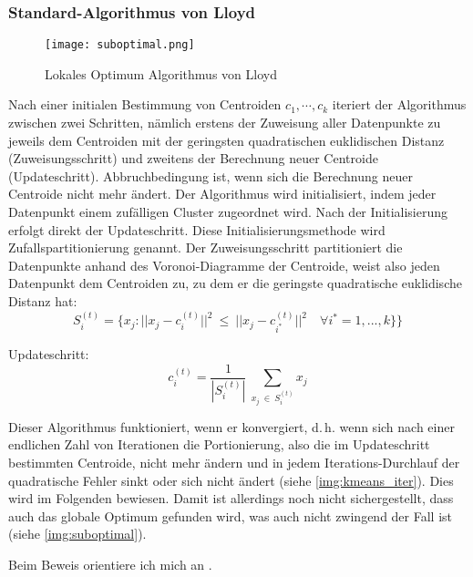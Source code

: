 \documentclass[a4paper,12pt,twoside]{article}
\begin{document}
\subsubsection{Standard-Algorithmus von Lloyd}

\begin{figure}
	\centering
	\texttt{[image: suboptimal.png]}
	\caption{Lokales Optimum Algorithmus von Lloyd}
	\label{img:suboptimal}
\end{figure}

Nach einer initialen Bestimmung von Centroiden $c_1,\cdots,c_k$ iteriert der Algorithmus zwischen zwei Schritten, nämlich erstens der Zuweisung aller Datenpunkte zu jeweils dem Centroiden mit der geringsten quadratischen euklidischen Distanz (Zuweisungsschritt) und zweitens der Berechnung neuer Centroide (Updateschritt). Abbruchbedingung ist, wenn sich die Berechnung neuer Centroide nicht mehr ändert.
Der Algorithmus wird initialisiert, indem jeder Datenpunkt einem zufälligen Cluster zugeordnet wird. Nach der Initialisierung erfolgt direkt der Updateschritt. Diese Initialisierungsmethode wird Zufallspartitionierung genannt.
Der Zuweisungsschritt partitioniert die Datenpunkte anhand des Voronoi-Diagramme der Centroide, weist also jeden Datenpunkt dem Centroiden zu, zu dem er die geringste quadratische euklidische Distanz hat:
\begin{equation}
S_{i}^{(t)} = \lbrace x_{j} : || x_{j} - c_{i}^{(t)}||^{2} ~ \leq ~ || x_{j} - c_{i^{*}}^{(t)}||^{2} \quad \forall i^{*} = 1,{...},k\rbrace\rbrace
\end{equation}

Updateschritt:
\begin{equation}
c_{i}^{(t)}= \frac{1}{|S_{i}^{(t)}|} ~ \sum_{x_{j}~\in~S_{i}^{(t)}} x_{j}
\end{equation}

Dieser Algorithmus funktioniert, wenn er konvergiert, d.\,h. wenn sich nach einer endlichen Zahl von Iterationen die Portionierung, also die im Updateschritt bestimmten Centroide, nicht mehr ändern und in jedem Iterations-Durchlauf der quadratische Fehler sinkt oder sich nicht ändert (siehe \autoref{img:kmeans_iter}). Dies wird im Folgenden bewiesen. Damit ist allerdings noch nicht sichergestellt, dass auch das globale Optimum gefunden wird, was auch nicht zwingend der Fall ist (siehe \autoref{img:suboptimal}). \autocite[][131ff]{Lloyd..1982}

Beim Beweis orientiere ich mich an \textcite{ChristianSchulz.2015} \autocite[vgl. auch][1282ff]{Tang.2011}.
\end{document}

